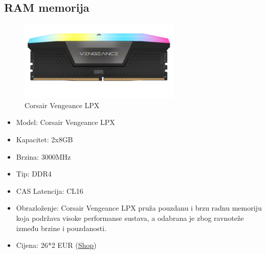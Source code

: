 \documentclass{article}
\begin{document}
\subsection{RAM memorija}
\begin{figure}[H]
    \centering
    \includegraphics[width = \textwidth]{Slike/ram.jpg}
    \caption{Corsair Vengeance LPX}
    \label{fig:RAM}
\end{figure}
\begin{itemize}
    \item Model: Corsair Vengeance LPX
    \item Kapacitet: 2x8GB
    \item Brzina: 3000MHz
    \item Tip: DDR4
    \item CAS Latencija: CL16
    \item Obrazloženje: Corsair Vengeance LPX pruža pouzdanu i brzu radnu memoriju koja podržava visoke performanse sustava, a odabrana je zbog ravnoteže između brzine i pouzdanosti.
    \item Cijena: 26*2 EUR (\href{https://laptopi.hr/informatika/komponente/memorije-1/ddr4-vengeance-lpx-8gb-3000-1-8gb-black-cl16-detail?utm_source=nabava.net&utm_campaign=nabava.net&utm_medium=click}{Shop})
\end{itemize}
\end{document}
